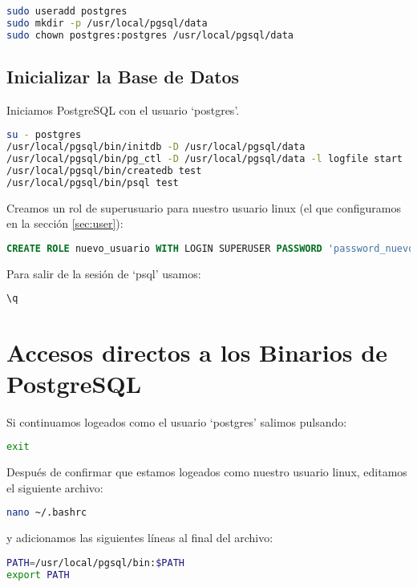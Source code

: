\documentclass{article}
\begin{document}
\begin{lstlisting}[language=bash]
sudo useradd postgres
sudo mkdir -p /usr/local/pgsql/data
sudo chown postgres:postgres /usr/local/pgsql/data
\end{lstlisting}

\subsection{Inicializar la Base de Datos}
Iniciamos PostgreSQL con el usuario `postgres'.

\begin{lstlisting}[language=bash]
su - postgres
/usr/local/pgsql/bin/initdb -D /usr/local/pgsql/data
/usr/local/pgsql/bin/pg_ctl -D /usr/local/pgsql/data -l logfile start
/usr/local/pgsql/bin/createdb test
/usr/local/pgsql/bin/psql test
\end{lstlisting}

Creamos un rol de superusuario para nuestro usuario linux (el que configuramos en la sección \ref{sec:user}):

\begin{lstlisting}[language=sql]
CREATE ROLE nuevo_usuario WITH LOGIN SUPERUSER PASSWORD 'password_nuevo_usuario';
\end{lstlisting}

Para salir de la sesión de `psql' usamos:

\begin{lstlisting}[language=sql]
\q
\end{lstlisting}

\section{Accesos directos a los Binarios de PostgreSQL}
Si continuamos logeados como el usuario `postgres' salimos pulsando:

\begin{lstlisting}[language=bash]
exit
\end{lstlisting}

Después de confirmar que estamos logeados como nuestro usuario linux, editamos el siguiente archivo:

\begin{lstlisting}[language=bash]
nano ~/.bashrc
\end{lstlisting}

y adicionamos las siguientes líneas al final del archivo:

\begin{lstlisting}[language=bash]
PATH=/usr/local/pgsql/bin:$PATH
export PATH
\end{lstlisting}
\end{document}
